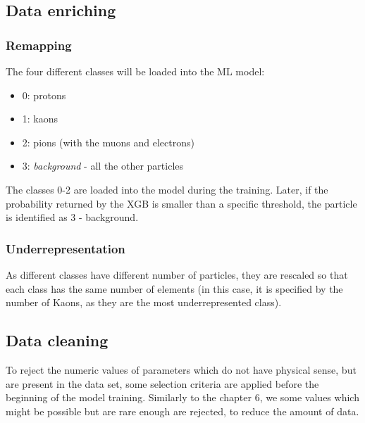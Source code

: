 \subsection{Data enriching}
\subsubsection{Remapping}
The four different classes will be loaded into the ML model:
\begin{itemize}
    \item 0: protons
    \item 1: kaons
    \item 2: pions (with the muons and electrons)
    \item 3: \emph{background} - all the other particles
\end{itemize}
The classes 0-2 are loaded into the model during the training. Later, if the probability returned by the XGB is smaller than a specific threshold, the particle is identified as 3 - background.
\subsubsection{Underrepresentation}
As different classes have different number of particles, they are rescaled so that each class has the same number of elements (in this case, it is specified by the number of Kaons, as they are the most underrepresented class).
\subsection{Data cleaning}
To reject the numeric values of parameters which do not have physical sense, but are present in the data set, some selection criteria are applied before the beginning of the model training. Similarly to the chapter 6, we some values which might be possible but are rare enough are rejected, to reduce the amount of data.

